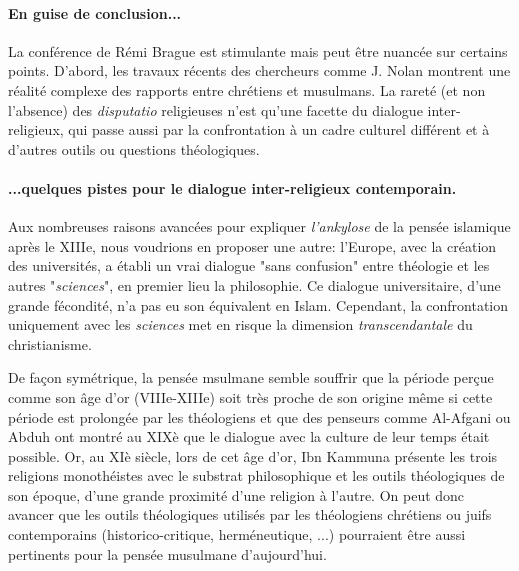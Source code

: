  

\paragraph{En guise de conclusion...} La conférence de Rémi Brague est stimulante mais peut être nuancée sur certains points. D'abord, les travaux récents des chercheurs comme J. Nolan montrent une réalité complexe des rapports entre chrétiens et musulmans. La rareté (et non l'absence) des \textit{disputatio} religieuses n'est qu'une facette du dialogue inter-religieux, qui passe aussi par la confrontation à un cadre culturel différent et à d'autres outils ou questions théologiques. 

\paragraph{...quelques pistes pour le dialogue inter-religieux contemporain.}

Aux nombreuses raisons avancées pour expliquer \textit{l'ankylose} de la pensée islamique après le XIIIe\cite{brague_sur_2023}, nous voudrions en proposer une autre:  l'Europe, avec la création des universités, a établi un vrai dialogue "sans confusion" entre théologie et les autres "\textit{sciences}", en premier lieu la philosophie. Ce dialogue universitaire, d'une grande fécondité, n'a pas eu son équivalent en Islam. Cependant, la confrontation uniquement avec les \textit{sciences} met en risque la dimension \textit{transcendantale} du christianisme. 

De façon symétrique, la pensée msulmane semble souffrir que la période perçue comme son âge d'or (VIIIe-XIIIe) soit très proche de son origine\cite[p.84]{brague_sur_2023} même si cette période est prolongée par les théologiens \cite{CandiardTheoIslam} et que des penseurs comme Al-Afgani ou Abduh ont montré au XIXè que le dialogue avec la culture de leur temps était possible. Or, au XIè siècle, lors de cet âge d'or, Ibn Kammuna \cite{ibn_kammuna_examen_2012} présente les trois religions monothéistes avec le substrat philosophique et les outils théologiques de son époque, d'une grande proximité d'une religion à l'autre. On peut donc avancer que les outils théologiques  utilisés par les théologiens chrétiens ou juifs contemporains (historico-critique, herméneutique, ...) pourraient être aussi pertinents pour la pensée musulmane d'aujourd'hui.  




\begin{comment}
  \begin{singlequote}
    il a tendance à considérer que son apogée s'est situé à son début et que son histoire postérieure est celle d'un éloignement constant à partir de ce sommet. Il attribue à Mahomet des déclarations en ce sens comme :\textit{ «Le pire dans les choses, c'est ce qu'elles ont de nouveau» }  
\end{singlequote}  
\end{comment}

 
  